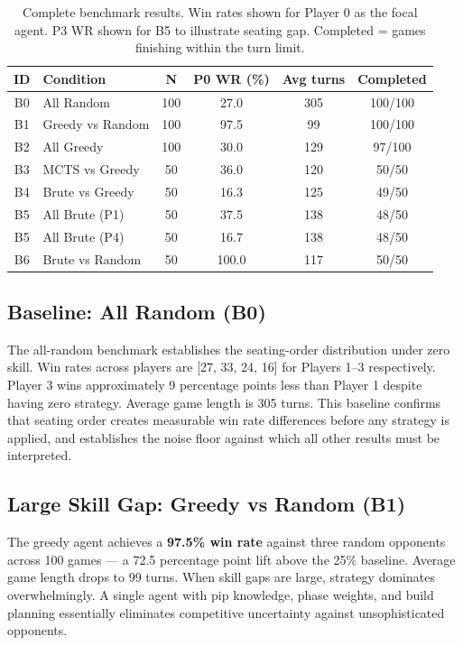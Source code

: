\documentclass[12pt,a4paper]{article}
\begin{document}
{\begin{table}[H]
  \centering
  \caption{Complete benchmark results. Win rates shown for Player 0 as
  the focal agent. P3 WR shown for B5 to illustrate seating gap.
  Completed = games finishing within the turn limit.}
  \label{tab:results}
  \renewcommand{\arraystretch}{1.3}
  \begin{tabular}{clcccc}
    \toprule
    \textbf{ID} & \textbf{Condition} & \textbf{N} &
    \textbf{P0 WR (\%)} & \textbf{Avg turns} & \textbf{Completed} \\
    \midrule
    B0 & All Random          & 100 & 27.0 & 305 & 100/100 \\
    B1 & Greedy vs Random    & 100 & 97.5 & 99  & 100/100 \\
    B2 & All Greedy          & 100 & 30.0 & 129 & 97/100  \\
    B3 & MCTS vs Greedy      & 50  & 36.0 & 120 & 50/50   \\
    B4 & Brute vs Greedy     & 50  & 16.3 & 125 & 49/50   \\
    B5 & All Brute (P1)      & 50  & 37.5 & 138 & 48/50   \\
    B5 & All Brute (P4)      & 50  & 16.7 & 138 & 48/50   \\
    B6 & Brute vs Random     & 50  & 100.0 & 117 & 50/50  \\
    \bottomrule
  \end{tabular}
\end{table}

\subsection{Baseline: All Random (B0)}

The all-random benchmark establishes the seating-order distribution
under zero skill. Win rates across players are [27, 33, 24, 16] for
Players 1--3 respectively. Player 3 wins approximately 9 percentage
points less than Player 1 despite having zero strategy. Average game
length is 305 turns. This baseline confirms that seating order creates
measurable win rate differences before any strategy is applied, and
establishes the noise floor against which all other results must be
interpreted.

\subsection{Large Skill Gap: Greedy vs Random (B1)}

The greedy agent achieves a \textbf{97.5\% win rate} against three
random opponents across 100 games --- a 72.5 percentage point lift above
the 25\% baseline. Average game length drops to 99 turns. When skill
gaps are large, strategy dominates overwhelmingly. A single agent with
pip knowledge, phase weights, and build planning essentially eliminates
competitive uncertainty against unsophisticated opponents.

}
\end{document}
